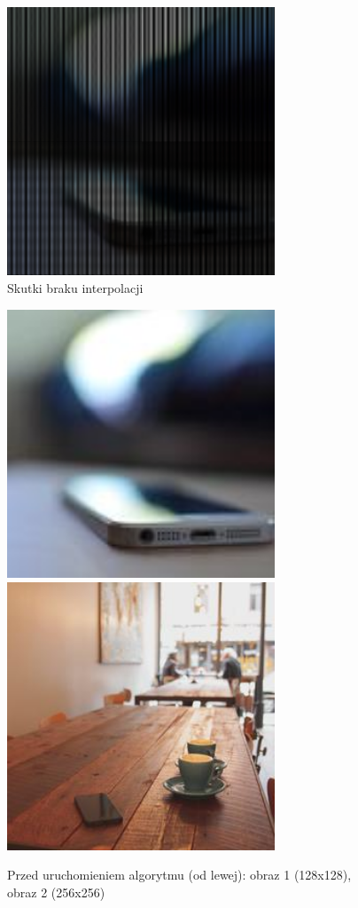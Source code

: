 \documentclass[a4paper,12pt]{book}
\begin{document}
\begin{figure}[H]
	\caption{Skutki braku interpolacji}
	\begin{center}
		\includegraphics[width=8cm, height=8cm]{1-4/phone-without-interpolation.png}
	\end{center}
\end{figure}
\begin{figure}[H]
	\caption{Przed uruchomieniem algorytmu (od lewej): obraz 1 (128x128), obraz 2 (256x256)}
	\includegraphics[width=8cm, height=8cm]{phone-unmodified.jpg}
	\includegraphics[width=8cm, height=8cm]{coffee-unmodified.jpg}
\end{figure}
\end{document}

